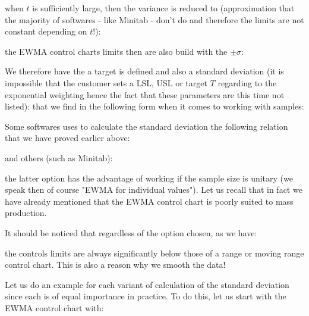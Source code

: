	when $t$ is sufficiently large, then the variance is reduced to (approximation that the majority of softwares - like Minitab - don't do and therefore the limits are not constant depending on $t$!):
	
	the EWMA control charts limits then are also build with the $\pm\sigma$:
	
	We therefore have the a target is defined and also a standard deviation (it is impossible that the customer sets  a LSL, USL or target $T$ regarding to the exponential weighting hence the fact that these parameters are this time not listed):
	that we find in the following form when it comes to working with samples:
	
	Some softwares uses to calculate the standard deviation the following relation that we have proved earlier above:
	
	and others (such as Minitab):
	
	the latter option has the advantage of working if the sample size is unitary (we speak then of course "EWMA for individual values"). Let us recall that in fact we have already mentioned that the EWMA control chart is poorly suited to mass production.
	
	It should be noticed that regardless of the option chosen, as we have:
	
	the controls limits are always significantly below those of a range or moving range control chart. This is also a reason why we smooth the data!

	Let us do an example for each variant of calculation of the standard deviation since each is of equal importance in practice. To do this, let us start with the EWMA control chart with:
	
